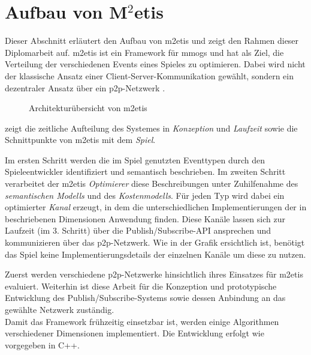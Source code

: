 \section{Aufbau von M$^2$etis}
\label{chap:grundlagen:aufbau_metis}

Dieser Abschnitt erläutert den Aufbau von \ac{m2etis}  und zeigt den Rahmen dieser Diplomarbeit auf. \ac{m2etis} ist ein Framework für \acp{mmog} und hat als Ziel, die Verteilung der verschiedenen Events eines Spieles zu optimieren. Dabei wird nicht der klassische Ansatz einer Client-Server-Kommunikation gewählt, sondern ein dezentraler Ansatz über ein \ac{p2p}-Netzwerk \cite{Fischer2010a, Fischer2010Event}.

\begin{figure}[htbp]
\centering
{}
\caption{Architekturübersicht von \ac{m2etis}}
\label{fig:metis_aufbau}
\end{figure}

 zeigt die zeitliche Aufteilung des Systemes in \emph{Konzeption} und \emph{Laufzeit} sowie die Schnittpunkte von \ac{m2etis} mit dem \emph{Spiel}.

Im ersten Schritt werden die im Spiel genutzten Eventtypen durch den Spieleentwickler identifiziert und semantisch beschrieben. Im zweiten Schritt verarbeitet der \ac{m2etis} \emph{Optimierer} diese Beschreibungen unter Zuhilfenahme des \emph{semantischen Modells} und des \emph{Kostenmodells}. Für jeden Typ wird dabei ein optimierter \emph{Kanal} erzeugt, in dem die unterschiedlichen Implementierungen der in \cite{Fischer2010a} beschriebenen Dimensionen Anwendung finden. Diese Kanäle lassen sich zur Laufzeit (im 3. Schritt) über die Publish/Subscribe-API ansprechen und kommunizieren über das \ac{p2p}-Netzwerk. Wie in der Grafik ersichtlich ist, benötigt das Spiel keine Implementierungsdetails der einzelnen Kanäle um diese zu nutzen.

Zuerst werden verschiedene \ac{p2p}-Netzwerke hinsichtlich ihres Einsatzes für \ac{m2etis} evaluiert. Weiterhin ist diese Arbeit für die Konzeption und prototypische Entwicklung des Publish/Subscribe-Systems sowie dessen Anbindung an das gewählte Netzwerk zuständig.\\
Damit das Framework frühzeitig einsetzbar ist, werden einige Algorithmen verschiedener Dimensionen implementiert. Die Entwicklung erfolgt wie vorgegeben in C++.
